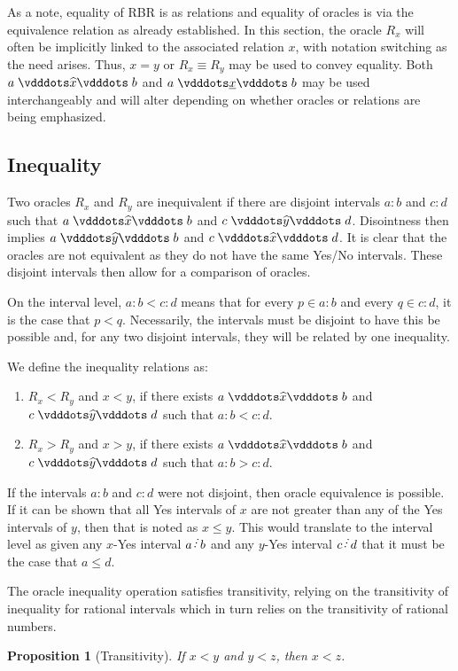 \documentclass[12pt]{article}
\newtheorem{proposition}{Proposition}[section]
\begin{document}
As a note, equality of RBR is as relations and equality of oracles is via the equivalence relation as already established. In this section, the oracle $R_x$ will often be implicitly linked to the associated relation $x$, with notation switching as the need arises. Thus, $x = y$ or $R_x \equiv R_y$ may be used to convey equality. Both $a \xora b$ and $a \xrel b$ may be used interchangeably and will alter depending on whether oracles or relations are being emphasized. 

\subsection{Inequality}

Two oracles $R_x$ and $R_y$ are inequivalent if there are disjoint intervals $a:b$ and $c:d$ such that $a \xora b$ and $c \xora[y] d$. Disointness then implies \sout{$a \xora[y] b$} and \sout{$c \xora d$}. It is clear that the oracles are not equivalent as they do not have the same Yes/No intervals. These disjoint intervals then allow for a comparison of oracles. 

On the interval level, $a:b < c:d$ means that for every $p \in a:b$ and every $q \in c:d$, it is the case that $p < q$. Necessarily, the intervals must be disjoint to have this be possible and, for any two disjoint intervals, they will be related by one inequality. 

We define the inequality relations as:
\begin{enumerate}
    \item $R_x < R_y$ and $x < y$, if there exists $a \xora b$ and $c \xora[y] d$ such that $a:b<c:d$.
    \item $R_x > R_y$ and $x > y$, if there exists $a \xora b$ and $c \xora[y] d$ such that $a:b > c:d$.
\end{enumerate}

If the intervals $a:b$ and $c:d$ were not disjoint, then oracle equivalence is possible. If it can be shown that all Yes intervals of $x$ are not greater than any of the Yes intervals of $y$, then that is noted as $x \leq y$. This would translate to the interval level as given any $x$-Yes interval $a \lte b$ and any $y$-Yes interval $c \lte d$ that it must be the case that $a \leq d$. 

The oracle inequality operation satisfies transitivity, relying on the transitivity of inequality for rational intervals which in turn relies on the transitivity of rational numbers. 

\begin{proposition}[Transitivity]
    If $x <y$ and $y<z$, then $x < z$.
\end{proposition}
\end{document}
